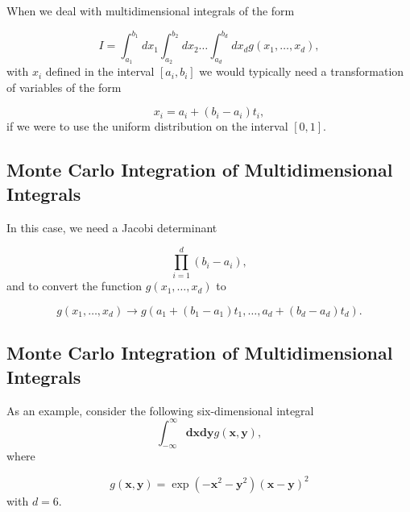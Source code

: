\documentclass[%
oneside,                 %
final,                   %
10pt]{article}
\newenvironment{block_mdfboxadmon}[1][]{
\begin{block_mdfboxmdframed}[frametitle=#1]
}
{
\end{block_mdfboxmdframed}
}
\begin{document}
\begin{block_mdfboxadmon}[]
When we deal with multidimensional integrals of the form

\begin{equation*} 
   I=\int_{a_1}^{b_1}dx_1\int_{a_2}^{b_2}dx_2\dots \int_{a_d}^{b_d}dx_d g(x_1,\dots,x_d),
\end{equation*}
with 
$x_i$ defined in the interval  $[a_i,b_i]$ we would typically
need a transformation
of variables of the form

\begin{equation*}
   x_i=a_i+(b_i-a_i)t_i,
\end{equation*}
if we were to use the uniform distribution on the interval $[0,1]$.
\end{block_mdfboxadmon} %



\subsection{Monte Carlo Integration of Multidimensional Integrals}

\begin{block_mdfboxadmon}[]
In this case, we need a 
Jacobi determinant

\begin{equation*}
  \prod_{i=1}^d (b_i-a_i),
\end{equation*}
and to convert the function $g(x_1,\dots,x_d)$ to

\begin{equation*}
   g(x_1,\dots,x_d)\rightarrow 
   g(a_1+(b_1-a_1)t_1,\dots,a_d+(b_d-a_d)t_d).
\end{equation*}
\end{block_mdfboxadmon} %



\subsection{Monte Carlo Integration of Multidimensional Integrals}

\begin{block_mdfboxadmon}[]
As an example, consider the following six-dimensional
integral
\begin{equation*}
   \int_{-\infty}^{\infty}\mathbf{dxdy}g(\mathbf{x, y}),
\end{equation*}
where

\begin{equation*}
  g(\mathbf{x, y})=\exp{(-\mathbf{x}^2-\mathbf{y}^2)}(\mathbf{x}-\mathbf{y})^2
\end{equation*}
with  $d=6$.
\end{block_mdfboxadmon} %
\end{document}

